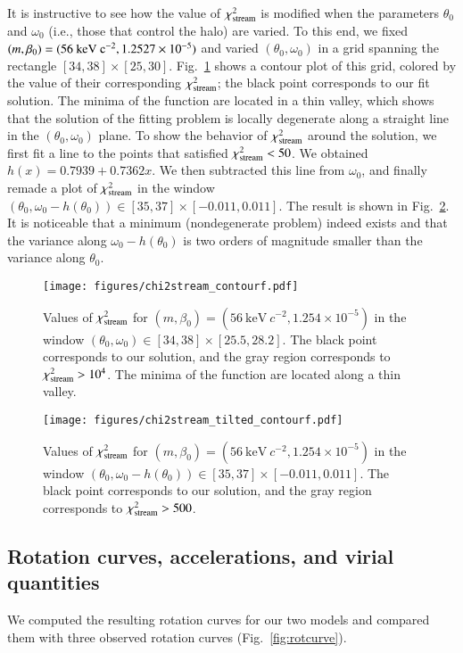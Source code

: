 \documentclass[twocolumn]{aa}
\begin{document}
It is instructive to see how the value of $\chi^2_{\rm{stream}}$ is modified when the parameters $\theta_0$ and $\omega_0$ (i.e., those that control the halo) are varied. To this end, we fixed $(m, \beta_0)=(56~\rm{keV}~c^{-2}, 1.2527\times10^{-5})$ and varied $(\theta_0, \omega_0)$ in a grid spanning the rectangle $[34, 38]\times[25, 30]$.
Fig.~\ref{fig:chi2stream} shows a contour plot of this grid, colored by the value of their corresponding $\chi^2_{\rm{stream}}$; the black point corresponds to our fit solution.
The minima of the function are located in a thin valley, which shows that the solution of the fitting problem is locally degenerate along a straight line in the $(\theta_0, \omega_0)$ plane.
To show the behavior of $\chi^2_{\rm{stream}}$ around the solution, we first fit a line to the points that satisfied $\chi^2_{\rm{stream}}<50$. We
obtained $h(x)= 0.7939+0.7362x$. We then subtracted this line from $\omega_0$, and finally remade a plot of $\chi^2_{\rm{stream}}$ in the window $(\theta_0, \omega_0-h(\theta_0))\in[35, 37]\times[-0.011,0.011]$. The result is shown in Fig.~\ref{fig:chi2stream_tilted}. It is noticeable that a minimum (nondegenerate problem) indeed exists and that
the variance along $\omega_0-h(\theta_0)$ is two orders of magnitude smaller than the variance along $\theta_0$.
%
\begin{figure}
   \centering
   \texttt{[image: figures/chi2stream\_contourf.pdf]}
   \caption{Values of $\chi^2_{\rm{stream}}$ for $(m, \beta_0)=(56~\mathrm{keV}~c^{-2}, 1.254\times10^{-5})$ in the window $(\theta_0, \omega_0)\in[34, 38]\times[25.5,28.2]$. The black point corresponds to our solution, and the gray region corresponds to $\chi^2_{\rm{stream}} >10^4$. The minima of the function are located along a thin valley.}
   \label{fig:chi2stream}
\end{figure}
\begin{figure}
   \centering
   \texttt{[image: figures/chi2stream\_tilted\_contourf.pdf]}
   \caption{Values of $\chi^2_{\rm{stream}}$ for $(m, \beta_0)=(56~\mathrm{keV}~c^{-2}, 1.254\times10^{-5})$ in
   the window $(\theta_0, \omega_0-h(\theta_0))\in[35, 37]\times[-0.011,0.011]$. The black point corresponds to our solution, and the gray region corresponds to $\chi^2_{\rm{stream}} > 500 $. }
   \label{fig:chi2stream_tilted}
\end{figure}

\subsection{Rotation curves, accelerations, and virial quantities}
We computed the resulting rotation curves for our two models and compared them with three observed rotation curves (Fig.~\ref{fig:rotcurve}).
\end{document}
